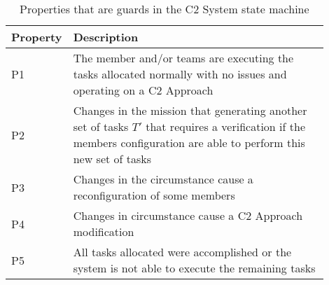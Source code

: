 \begin{table}[ht]
	\small
	\fontsize{10}{10}\selectfont
	\centering
	\caption{Properties that are guards in the C2 System state machine  }
	\label{table:table07}
	
	\begin{tabular}{p{0.1\linewidth}p{0.8\linewidth}}
	\hline
		\textbf{Property}
		& \textbf{Description}\\ [1ex]
	\hline	
	\centering
	P1 & The member and/or teams are executing the tasks allocated normally with no issues and operating on a C2 Approach \\[3ex]
	\centering
	P2 & Changes in the mission that generating another set of tasks $T'$ that requires a verification if the members configuration are able to perform this new set of tasks \\[3ex]
	\centering
	P3 & Changes in the circumstance cause a reconfiguration of some members \\[3ex]
	\centering
	P4 & Changes in circumstance cause a C2 Approach modification \\[3ex]
	\centering
	P5 & All tasks allocated were accomplished or the system is not able to execute the remaining tasks
	\end{tabular}\hline 
\end{table} 